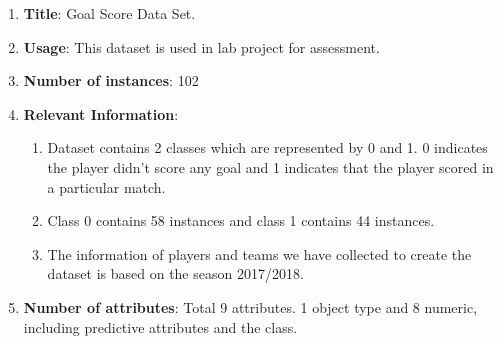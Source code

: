 \documentclass[10pt,a4paper]{article}
\begin{document}
\begin{enumerate}

    \item\textbf{Title}: Goal Score Data Set.
    
    \item\textbf{Usage}: This dataset is used in lab project for assessment.
    
    \item\textbf{Number of instances}: 102
    
    \item\textbf{Relevant Information}:
    \begin{enumerate}
    \item Dataset contains 2 classes which are represented by 0 and 1. 0 indicates the player didn't score any goal and 1 indicates that the player scored in a particular match. 
    
    \item Class 0 contains 58 instances and class 1 contains 44 instances.
    
    \item The information of players and teams we have collected to create the dataset is based on the season 2017/2018.
    \end{enumerate}
    
    
    \item\textbf{Number of attributes}: Total 9 attributes. 1 object type and 8 numeric, including predictive attributes and the class.
    

\end{enumerate}
\end{document}

